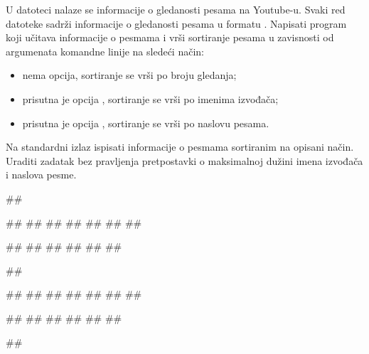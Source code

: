 \begin{Answer}[ref=3_24]
\end{Answer}
\begin{Exercise}[label=3_25]
U datoteci  nalaze se informacije o gledanosti pesama na
Youtube-u. Svaki red datoteke sadrži informacije o gledanosti
  pesama u formatu .
Napisati program koji učitava informacije o pesmama i vrši sortiranje
pesama u zavisnosti od argumenata komandne linije na sledeći način:
\begin{itemize}
\item nema opcija, sortiranje se vrši po broju gledanja;
\item prisutna je opcija , sortiranje se vrši po imenima
  izvođača;
\item prisutna je opcija , sortiranje se vrši po naslovu
  pesama.
\end{itemize}
Na standardni izlaz ispisati informacije o pesmama sortiranim na opisani
način. Uraditi zadatak bez pravljenja pretpostavki o maksimalnoj dužini
  imena izvođača i naslova pesme.

\begin{minitest}
\begin{test}{1}
##
  
##
##
##
##
##
##
##

#\naslovIzlaz#
##
##
##
##
##
\end{test}
\end{minitest}
\begin{minitest}
\begin{test}{2}
##
  
##
##
##
##
##
##
##

#\naslovIzlaz#
##
##
##
##
##
\end{test}
\end{minitest}
\begin{minitest}
\begin{test}{3}
##
  

\end{test}
\end{minitest}
\end{Exercise}
